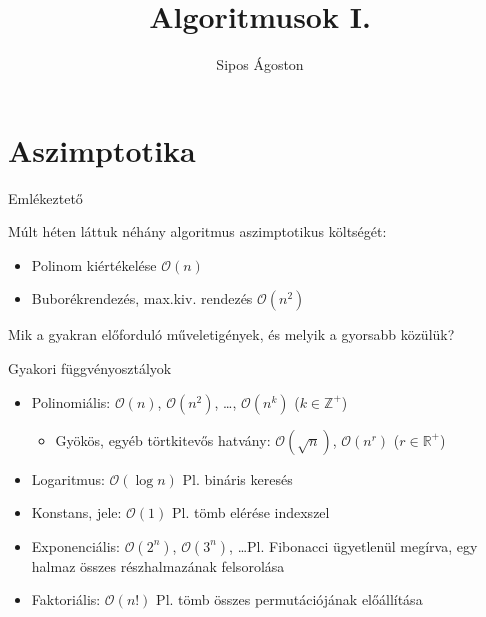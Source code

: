 \documentclass[hungarian]{beamer}
\title{Algoritmusok I.}
\author{Sipos Ágoston}
\newcommand{\Ord}{\mathcal{O}}
\begin{document}
\maketitle

\section{Aszimptotika}

\begin{frame}{Emlékeztető}

Múlt héten láttuk néhány algoritmus aszimptotikus költségét:
\begin{itemize}
    \item Polinom kiértékelése $\mathcal{O}(n)$
    \item Buborékrendezés, max.kiv. rendezés $\mathcal{O}(n^2)$
\end{itemize}

Mik a gyakran előforduló műveletigények, és melyik a gyorsabb közülük?
    
\end{frame}

\begin{frame}{Gyakori függvényosztályok}
\begin{itemize}
    \item Polinomiális: $\Ord(n)$, $\Ord(n^2)$, \dots, $\Ord(n^k)$ ($k \in \mathbb{Z^+}$)
    \begin{itemize}
        \item Gyökös, egyéb törtkitevős hatvány: $\Ord(\sqrt{n})$, $\Ord(n^r)$ ($r \in \mathbb{R}^+$)
    \end{itemize}
    \item Logaritmus: $\Ord(\log n)$ Pl. bináris keresés
    \item Konstans, jele: $\Ord(1)$ Pl. tömb elérése indexszel
    \item Exponenciális: $\Ord(2^n)$, $\Ord(3^n)$, \dots Pl. Fibonacci ügyetlenül megírva, egy halmaz összes részhalmazának felsorolása
    \item Faktoriális: $\Ord(n!)$ Pl. tömb összes permutációjának előállítása
\end{itemize}
\end{frame}
\end{document}
